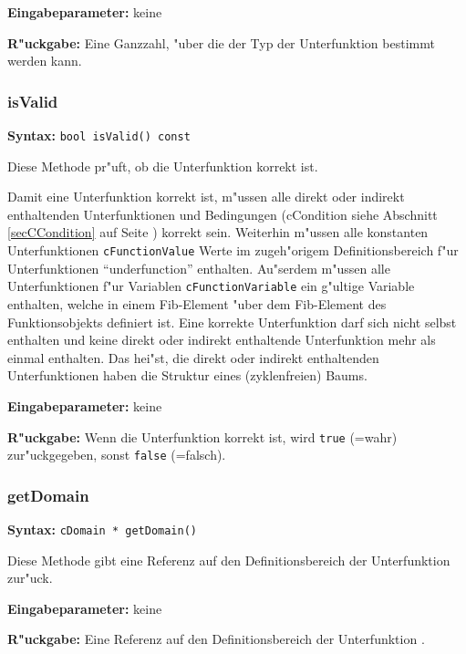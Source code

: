 \bigskip\noindent
\textbf{Eingabeparameter:} keine

\bigskip\noindent
\textbf{R"uckgabe:} Eine Ganzzahl, "uber die der Typ der Unterfunktion bestimmt werden kann.


\subsubsection{isValid}

\textbf{Syntax:} \verb|bool isValid() const|

\bigskip\noindent
Diese Methode pr"uft, ob die Unterfunktion korrekt ist.

Damit eine Unterfunktion korrekt ist, m"ussen alle direkt oder indirekt enthaltenden Unterfunktionen und Bedingungen (cCondition siehe Abschnitt \ref{secCCondition} auf Seite \pageref{secCCondition}) korrekt sein. Weiterhin m"ussen alle konstanten Unterfunktionen \verb|cFunctionValue| Werte im zugeh"origem Definitionsbereich f"ur Unterfunktionen ``underfunction'' enthalten. Au"serdem m"ussen alle Unterfunktionen f"ur Variablen \verb|cFunctionVariable| ein g"ultige Variable enthalten, welche in einem Fib-Element "uber dem Fib-Element des Funktionsobjekts definiert ist.
Eine korrekte Unterfunktion darf sich nicht selbst enthalten und keine direkt oder indirekt enthaltende Unterfunktion mehr als einmal enthalten. Das hei"st, die direkt oder indirekt enthaltenden Unterfunktionen haben die Struktur eines (zyklenfreien) Baums.

\bigskip\noindent
\textbf{Eingabeparameter:} keine

\bigskip\noindent
\textbf{R"uckgabe:} Wenn die Unterfunktion korrekt ist, wird \verb|true| (=wahr) zur"uckgegeben, sonst \verb|false| (=falsch).


\subsubsection{getDomain}

\textbf{Syntax:} \verb|cDomain * getDomain()|

\bigskip\noindent
Diese Methode gibt eine Referenz auf den Definitionsbereich der Unterfunktion zur"uck.

\bigskip\noindent
\textbf{Eingabeparameter:} keine

\bigskip\noindent
\textbf{R"uckgabe:} Eine Referenz auf den Definitionsbereich der Unterfunktion .



